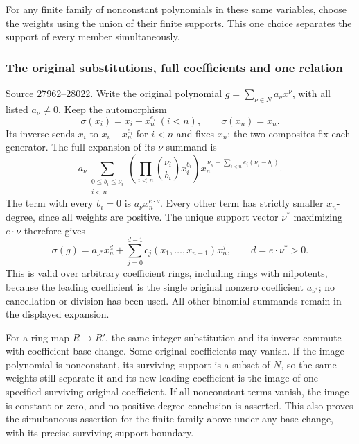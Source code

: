 For any finite family of nonconstant polynomials in these same variables, choose the weights using the union of their finite supports. This one choice separates the support of every member simultaneously.

\subsubsection{The original substitutions, full coefficients and one relation}\label{algebra-proof-026-the-original-substitutions-full-coefficients-and-one-relation}

Source 27962--28022. Write the original polynomial \(g=\sum_{\nu\in N}a_\nu x^\nu\), with all listed \(a_\nu\ne0\). Keep the automorphism \[
 \sigma(x_i)=x_i+x_n^{e_i}\ (i<n),\qquad \sigma(x_n)=x_n.
\] Its inverse sends \(x_i\) to \(x_i-x_n^{e_i}\) for \(i<n\) and fixes \(x_n\); the two composites fix each generator. The full expansion of its \(\nu\)-summand is \[
 a_\nu\sum_{\substack{0\leq b_i\leq\nu_i\\i<n}}
 \left(\prod_{i<n}\binom{\nu_i}{b_i}x_i^{b_i}\right)
 x_n^{\,\nu_n+\sum_{i<n}e_i(\nu_i-b_i)}.
\] The term with every \(b_i=0\) is \(a_\nu x_n^{e\cdot\nu}\). Every other term has strictly smaller \(x_n\)-degree, since all weights are positive. The unique support vector \(\nu^*\) maximizing \(e\cdot\nu\) therefore gives \[
 \sigma(g)=a_{\nu^*}x_n^{d}
              +\sum_{j=0}^{d-1}c_j(x_1,\ldots,x_{n-1})x_n^j,
 \qquad d=e\cdot\nu^*>0 .
\] This is valid over arbitrary coefficient rings, including rings with nilpotents, because the leading coefficient is the single original nonzero coefficient \(a_{\nu^*}\); no cancellation or division has been used. All other binomial summands remain in the displayed expansion.

For a ring map \(R\to R'\), the same integer substitution and its inverse commute with coefficient base change. Some original coefficients may vanish. If the image polynomial is nonconstant, its surviving support is a subset of \(N\), so the same weights still separate it and its new leading coefficient is the image of one specified surviving original coefficient. If all nonconstant terms vanish, the image is constant or zero, and no positive-degree conclusion is asserted. This also proves the simultaneous assertion for the finite family above under any base change, with its precise surviving-support boundary.

